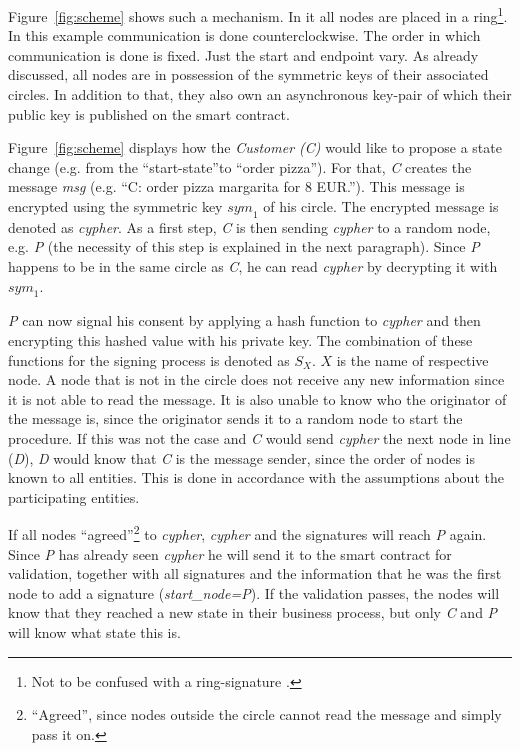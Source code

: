 \documentclass[runningheads]{llncs}
\newcommand{\ber}[1]{\textit{#1}}
\newcommand{\reffig}[1]{Figure~\ref{#1}}
\newcommand{\quotel}{``}
\newcommand{\quoter}{''}
\newcommand{\creditfootnote}[1]{}
\begin{document}
\reffig{fig:scheme} shows such a mechanism\creditfootnote{Credit: contract-icon in the \reffig{fig:scheme} made by Freepik (http://www.freepik.com) from www.flaticon.com}. In it all nodes are placed in a ring\footnote{Not to be confused with a ring-signature \cite{rivest2001leak}.}. In this example communication is done counterclockwise. The order in which communication is done is fixed. Just the start and endpoint vary. As already discussed, all nodes are in possession of the symmetric keys of their associated circles. In addition to that, they also own an asynchronous key-pair of which their public key is published on the smart contract.

\reffig{fig:scheme} displays how the \ber{Customer (C)} would like to propose a state change (e.g. from the \quotel start-state\quoter  to \quotel order pizza\quoter ). For that, \ber{C} creates the message \ber{msg} (e.g. \quotel C: order pizza margarita for 8 EUR.\quoter ). This message is encrypted using the symmetric key ${sym}_1$ of his circle. The encrypted message is denoted as \ber{cypher}. As a first step, \ber{C} is then sending \ber{cypher} to a random node, e.g. \ber{P} (the necessity of this step is explained in the next paragraph). Since \ber{P} happens to be in the same circle as \ber{C}, he can read \ber{cypher} by decrypting it with ${sym}_1$. 



\ber{P} can now signal his consent by applying a hash function to \ber{cypher} and then encrypting this hashed value with his private key. The combination of these functions for the signing process is denoted as $S_X$. $X$ is the name of respective node. A node that is not in the circle does not receive any new information since it is not able to read the message. It is also unable to know who the originator of the message is, since the originator sends it to a random node to start the procedure. If this was not the case and \ber{C} would send \ber{cypher} the next node in line (\ber{D}), \ber{D} would know that \ber{C} is the message sender, since the order of nodes is known to all entities. This is done in accordance with the assumptions about the participating entities. 


If all nodes \quotel agreed\quoter \footnote{\quotel Agreed\quoter, since nodes outside the circle cannot read the message and simply pass it on.} to \ber{cypher}, \ber{cypher} and the signatures will reach \ber{P} again. Since \ber{P} has already seen \ber{cypher} he will send it to the smart contract for validation, together with all signatures and the information that he was the first node to add a signature (\ber{start\_node=P}). If the validation passes, the nodes will know that they reached a new state in their business process, but only \ber{C} and \ber{P} will know what state this is.
\end{document}
